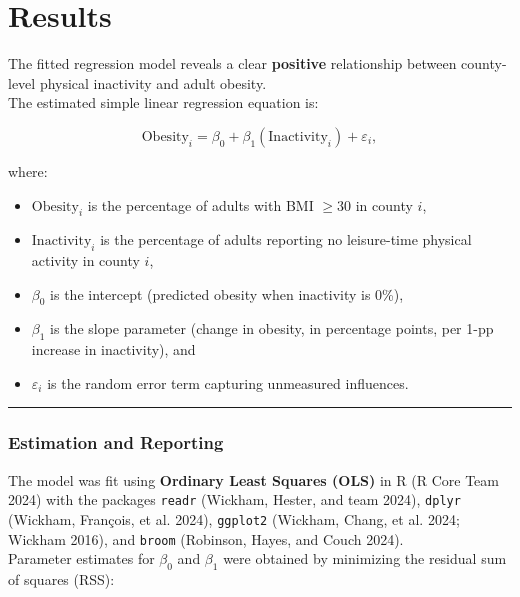 \documentclass[
  letterpaper,
  DIV=11,
  numbers=noendperiod]{scrartcl}
\providecommand{\tightlist}{%
  \setlength{\itemsep}{0pt}\setlength{\parskip}{0pt}}\usepackage{longtable,booktabs,array}
\begin{document}
\section{Results}\label{results}

The fitted regression model reveals a clear \textbf{positive}
relationship between county-level physical inactivity and adult
obesity.\\
The estimated simple linear regression equation is:

\[
\text{Obesity}_i = \beta_0 + \beta_1(\text{Inactivity}_i) + \varepsilon_i,
\]

where:

\begin{itemize}
\tightlist
\item
  \(\text{Obesity}_i\) is the percentage of adults with BMI \(\ge 30\)
  in county \(i\),\\
\item
  \(\text{Inactivity}_i\) is the percentage of adults reporting no
  leisure-time physical activity in county \(i\),\\
\item
  \(\beta_0\) is the intercept (predicted obesity when inactivity is
  0\%),\\
\item
  \(\beta_1\) is the slope parameter (change in obesity, in percentage
  points, per 1-pp increase in inactivity), and\\
\item
  \(\varepsilon_i\) is the random error term capturing unmeasured
  influences.
\end{itemize}

\begin{center}\rule{0.5\linewidth}{0.5pt}\end{center}

\subsubsection{Estimation and Reporting}\label{estimation-and-reporting}

The model was fit using \textbf{Ordinary Least Squares (OLS)} in R (R
Core Team 2024) with the packages \texttt{readr} (Wickham, Hester, and
team 2024), \texttt{dplyr} (Wickham, François, et al. 2024),
\texttt{ggplot2} (Wickham, Chang, et al. 2024; Wickham 2016), and
\texttt{broom} (Robinson, Hayes, and Couch 2024).\\
Parameter estimates for \(\beta_0\) and \(\beta_1\) were obtained by
minimizing the residual sum of squares (RSS):
\end{document}
